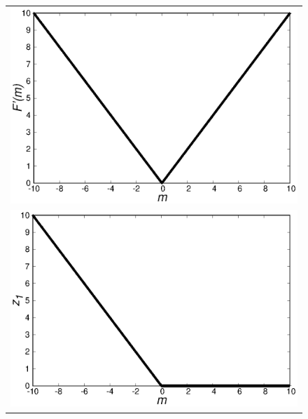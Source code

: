 \documentclass[fp,twocolumn]{jpsj3}
\begin{document}
\begin{figure}[htbp]
  \begin{center}
    \begin{tabular}{c}
      \begin{minipage}{0.50\hsize}
        \centering
        \includegraphics[keepaspectratio,scale=0.33]{minimum_cost_non_t.eps}
      \end{minipage} \\
      \begin{minipage}{0.50\hsize}
        \centering
        \includegraphics[keepaspectratio,scale=0.33]{minimum_z1_non_t.eps}
      \end{minipage}
      \begin{minipage}{0.50\hsize}
        \centering

\end{minipage}
\end{tabular}
\end{center}
\end{figure}
\end{document}
